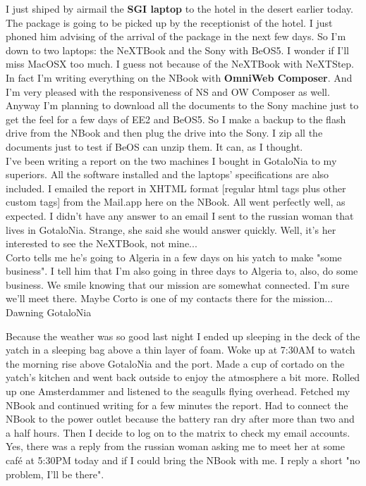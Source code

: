 \documentclass[11pt,twoside,a4paper]{book}
\begin{document}
\begin{multicols*}{2}
    I just shiped by airmail the \textbf{SGI laptop} to the hotel in the desert earlier today. The package is going to be picked up by the receptionist of the hotel. I just phoned him advising of the arrival of the package in the next few days. So I'm down to two laptops: the NeXTBook and the Sony with BeOS5. I wonder if I'll miss MacOSX too much. I guess not because of the NeXTBook with NeXTStep. In fact I'm writing everything on the NBook with \textbf{OmniWeb Composer}. And I'm very pleased with the responsiveness of NS and OW Composer as well. Anyway I'm planning to download all the documents to the Sony machine just to get the feel for a few days of EE2 and BeOS5. So I make a backup to the flash drive from the NBook and then plug the drive into the Sony. I zip all the documents just to test if BeOS can unzip them. It can, as I thought. ~\\

    I've been writing a report on the two machines I bought in GotaloNia to my superiors. All the software installed and the laptops' specifications are also included. I emailed the report in XHTML format [regular html tags plus other custom tags] from the Mail.app here on the NBook. All went perfectly well, as expected. I didn't have any answer to an email I sent to the russian woman that lives in GotaloNia. Strange, she said she would answer quickly. Well, it's her interested to see the NeXTBook, not mine... ~\\

    Corto tells me he's going to Algeria in a few days on his yatch to make "some business". I tell him that I'm also going in three days to Algeria to, also, do some business. We smile knowing that our mission are somewhat connected. I'm sure we'll meet there. Maybe Corto is one of my contacts there for the mission... ~\\

    {\small Dawning GotaloNia} %

    Because the weather was so good last night I ended up sleeping in the deck of the yatch in a sleeping bag above a thin layer of foam. Woke up at 7:30AM to watch the morning rise above GotaloNia and the port. Made a cup of cortado on the yatch's kitchen and went back outside to enjoy the atmosphere a bit more. Rolled up one Amsterdammer and listened to the seagulls flying overhead. Fetched my NBook and continued writing for a few minutes the report. Had to connect the NBook to the power outlet because the battery ran dry after more than two and a half hours. Then I decide to log on to the matrix to check my email accounts. Yes, there was a reply from the russian woman asking me to meet her at some caf{\'e} at 5:30PM today and if I could bring the NBook with me. I reply a short "no problem, I'll be there". ~\\


\end{multicols*}
\end{document}
